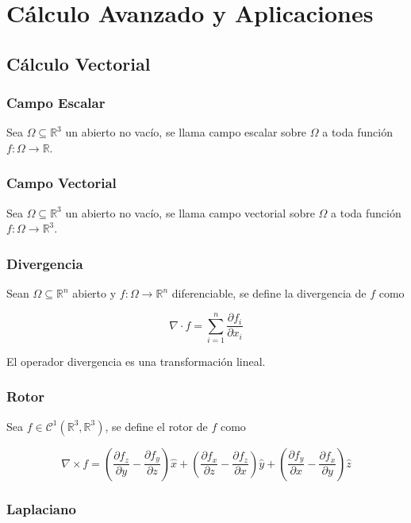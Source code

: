 \chapter{Cálculo Avanzado y Aplicaciones}

\section{Cálculo Vectorial}

\subsection{Campo Escalar}

Sea $\Omega\subseteq\mathbb{R}^3$ un abierto no vacío, se llama campo escalar sobre $\Omega$ a toda función $f:\Omega\to\mathbb{R}$.

\subsection{Campo Vectorial}

Sea $\Omega\subseteq\mathbb{R}^3$ un abierto no vacío, se llama
campo vectorial sobre $\Omega$ a toda función $f:\Omega\to\mathbb{R}^3$.

\subsection{Divergencia}

Sean $\Omega\subseteq\mathbb{R}^n$ abierto y $f:\Omega\to\mathbb{R}^n$ diferenciable, se define la divergencia de $f$ como

\[\nabla\cdot f=\sum^n_{i=1} \frac{\partial f_i}{\partial x_i}\]

El operador divergencia es una transformación lineal.

\subsection{Rotor}

Sea $f\in\mathcal{C}^1(\mathbb{R}^3,\mathbb{R}^3)$, se define el rotor de $f$ como

\[\nabla\times f = \left(\frac{\partial f_z}{\partial y}-
\frac{\partial f_y}{\partial z}\right)\hat{x}+
\left(\frac{\partial f_x}{\partial z}-
\frac{\partial f_z}{\partial x}\right)\hat{y}+
\left(\frac{\partial f_y}{\partial x}-
\frac{\partial f_x}{\partial y}\right)\hat{z}\]

\subsection{Laplaciano}

